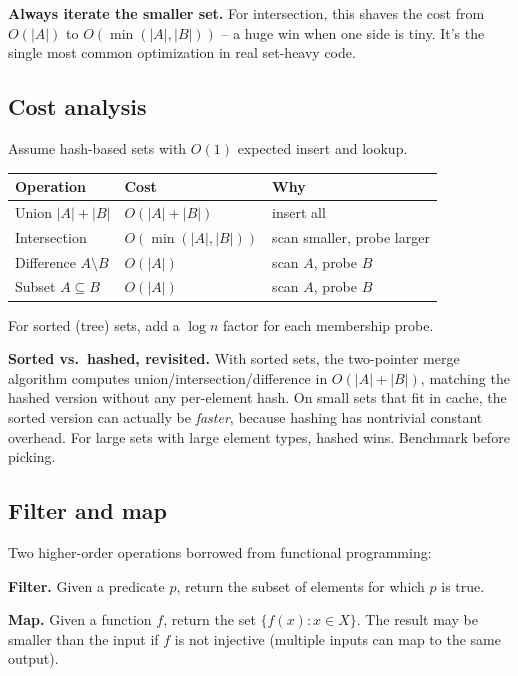 \documentclass[11pt]{article}
\begin{document}
\begin{warnbox}
\textbf{Always iterate the smaller set.} For intersection, this shaves the cost from $O(|A|)$ to $O(\min(|A|, |B|))$ -- a huge win when one side is tiny. It's the single most common optimization in real set-heavy code.
\end{warnbox}

\subsection*{Cost analysis}

Assume hash-based sets with $O(1)$ expected insert and lookup.

\begin{center}
\begin{tabular}{lll}
\hline
Operation & Cost & Why \\
\hline
Union $|A| + |B|$ & $O(|A| + |B|)$ & insert all \\
Intersection & $O(\min(|A|, |B|))$ & scan smaller, probe larger \\
Difference $A \setminus B$ & $O(|A|)$ & scan $A$, probe $B$ \\
Subset $A \subseteq B$ & $O(|A|)$ & scan $A$, probe $B$ \\
\hline
\end{tabular}
\end{center}

For sorted (tree) sets, add a $\log n$ factor for each membership probe.

\begin{ideabox}
\textbf{Sorted vs.\ hashed, revisited.} With sorted sets, the two-pointer merge algorithm computes union/intersection/difference in $O(|A| + |B|)$, matching the hashed version without any per-element hash. On small sets that fit in cache, the sorted version can actually be \emph{faster}, because hashing has nontrivial constant overhead. For large sets with large element types, hashed wins. Benchmark before picking.
\end{ideabox}

\subsection*{Filter and map}

Two higher-order operations borrowed from functional programming:

\begin{defnbox}
\textbf{Filter.} Given a predicate $p$, return the subset of elements for which $p$ is true.

\textbf{Map.} Given a function $f$, return the set $\{f(x) : x \in X\}$. The result may be smaller than the input if $f$ is not injective (multiple inputs can map to the same output).
\end{defnbox}
\end{document}
